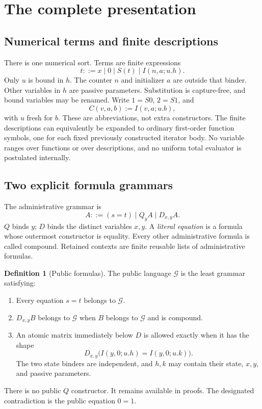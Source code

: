 \documentclass[11pt,letterpaper]{article}
\theoremstyle{definition}\newtheorem{definition}[theorem]{Definition}
\theoremstyle{remark}\newtheorem{remark}[theorem]{Remark}
\newcommand{\CG}{\mathcal G}
\begin{document}
\section{The complete presentation}\label{sec:rules}

\subsection{Numerical terms and finite descriptions}

There is one numerical sort. Terms are finite expressions
\[
 t ::= x\mid0\mid S(t)\mid I(n,a;u.h).
\]
Only $u$ is bound in $h$. The counter $n$ and initializer $a$ are outside
that binder. Other variables in $h$ are passive parameters. Substitution
is capture-free, and bound variables may be renamed.
Write $1=S0$, $2=S1$, and
\[
 C(v,a,b):=I(v,a;u.b),
\]
with $u$ fresh for $b$. These are abbreviations, not extra constructors.
The finite descriptions can equivalently be expanded to ordinary first-order
function symbols, one for each fixed previously constructed iterator body.
No variable ranges over functions or over descriptions, and no uniform
total evaluator is postulated internally.

\subsection{Two explicit formula grammars}

The administrative grammar is
\[
 A ::= (s=t)\mid Q_y A\mid D_{x,y}A.
\]
$Q$ binds $y$; $D$ binds the distinct variables $x,y$. A \emph{literal
equation} is a formula whose outermost constructor is equality.
Every other administrative formula is called compound. Retained contexts
are finite reusable lists of administrative formulas.

\begin{definition}[Public formulas]\label{def:public}
The public language $\CG$ is the least grammar satisfying:
\begin{enumerate}
\item Every equation $s=t$ belongs to $\CG$.
\item $D_{x,y}B$ belongs to $\CG$ when $B$ belongs to $\CG$ and is compound.
\item An atomic matrix immediately below $D$ is allowed exactly when it has
      the shape
      \[
       D_{x,y}\bigl(I(y,0;u.h)=I(y,0;u.k)\bigr).
      \]
      The two state binders are independent, and $h,k$ may contain their
      state, $x,y$, and passive parameters.
\end{enumerate}
There is no public $Q$ constructor. It remains available in proofs.
The designated contradiction is the public equation $0=1$.
\end{definition}
\end{document}
